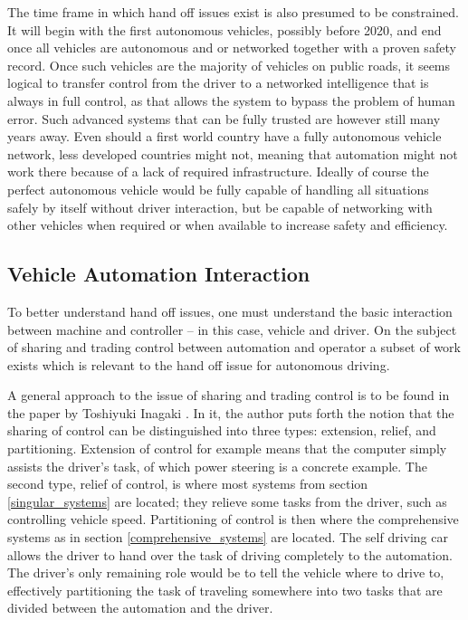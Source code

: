 \documentclass{acm_proc_article-sp}
\begin{document}
The time frame in which hand off issues exist is also presumed to be constrained.
It will begin with the first autonomous vehicles, possibly before 2020, and end once all vehicles are autonomous and or networked together with a proven safety record.
Once such vehicles are the majority of vehicles on public roads, it seems logical to transfer control from the driver to a networked intelligence that is always in full control, as that allows the system to bypass the problem of human error.
Such advanced systems that can be fully trusted are however still many years away.
Even should a first world country have a fully autonomous vehicle network, less developed countries might not, meaning that automation might not work there because of a lack of required infrastructure.
Ideally of course the perfect autonomous vehicle would be fully capable of handling all situations safely by itself without driver interaction, but be capable of networking with other vehicles when required or when available to increase safety and efficiency.

\subsection{Vehicle Automation Interaction}

To better understand hand off issues, one must understand the basic interaction between machine and controller – in this case, vehicle and driver.
On the subject of sharing and trading control between automation and operator a subset of work exists which is relevant to the hand off issue for autonomous driving.

A general approach to the issue of sharing and trading control is to be found in the paper by Toshiyuki Inagaki \cite{inagaki:adaptive}.
In it, the author puts forth the notion that the sharing of control can be distinguished into three types: extension, relief, and partitioning.
Extension of control for example means that the computer simply assists the driver's task, of which power steering is a concrete example.
The second type, relief of control, is where most systems from section \ref{singular_systems} are located; they relieve some tasks from the driver, such as controlling vehicle speed.
Partitioning of control is then where the comprehensive systems as in section \ref{comprehensive_systems} are located.
The self driving car allows the driver to hand over the task of driving completely to the automation.
The driver's only remaining role would be to tell the vehicle where to drive to, effectively partitioning the task of traveling somewhere into two tasks that are divided between the automation and the driver.
\end{document}
